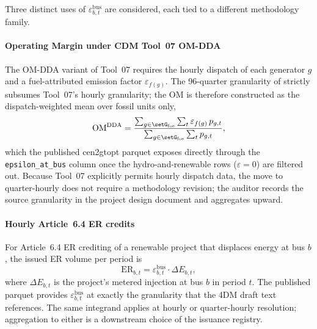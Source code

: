 Three distinct uses of $\varepsilon^{\mathrm{bus}}_{b,t}$ are
considered, each tied to a different methodology family.

\paragraph{Operating Margin under CDM Tool~07 OM-DDA}
The OM-DDA variant of Tool~07 requires the hourly dispatch of each
generator $g$ and a fuel-attributed emission factor
$\varepsilon_{f(g)}$.  The 96-quarter granularity of \cenpipe{}
strictly subsumes Tool~07's hourly granularity; the OM is therefore
constructed as the dispatch-weighted mean over fossil units only,
\begin{equation}
\mathrm{OM}^{\mathrm{DDA}} =
  \frac{\sum_{g\in\setG_{\mathrm{fos}}} \sum_t
        \varepsilon_{f(g)}\,p_{g,t}}
       {\sum_{g\in\setG_{\mathrm{fos}}} \sum_t p_{g,t}},
\label{eq:om-dda}
\end{equation}
which the published cen2gtopt parquet exposes directly through the
\texttt{epsilon\_at\_bus} column once the hydro-and-renewable rows
($\varepsilon=0$) are filtered out.  Because Tool~07 explicitly
permits hourly dispatch data, the move to quarter-hourly does not
require a methodology revision; the auditor records the source
granularity in the project design document and aggregates upward.

\paragraph{Hourly Article~6.4 ER credits}
For Article~6.4 ER crediting of a renewable project that displaces
energy at bus $b$, the issued ER volume per period is
\begin{equation}
\mathrm{ER}_{b,t} =
  \varepsilon^{\mathrm{bus}}_{b,t} \cdot \Delta E_{b,t},
\label{eq:er-art64}
\end{equation}
where $\Delta E_{b,t}$ is the project's metered injection at bus $b$
in period $t$.  The published parquet provides
$\varepsilon^{\mathrm{bus}}_{b,t}$ at exactly the granularity that
the 4DM draft text references.  The same integrand applies at hourly
or quarter-hourly resolution; aggregation to either is a downstream
choice of the issuance registry.

